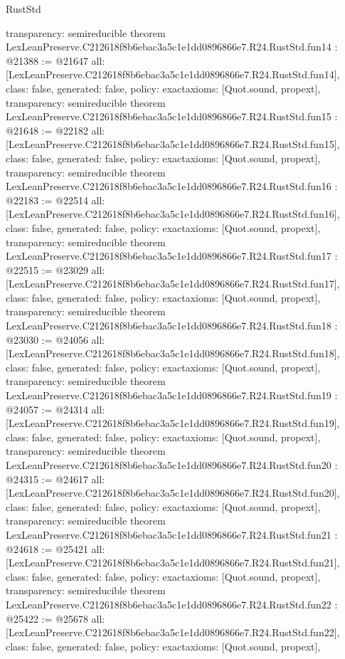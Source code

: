\begin{lexlean}{RustStd}
\begin{coremodule}
{  transparency: semireducible
}
theorem LexLeanPreserve.C212618f8b6ebac3a5c1e1dd0896866e7.R24.RustStd.fun14 : @21388 := @21647 {
  all: [LexLeanPreserve.C212618f8b6ebac3a5c1e1dd0896866e7.R24.RustStd.fun14],
  class: false,
  generated: false,
  policy: exact{axioms: [Quot.sound, propext]},
  transparency: semireducible
}
theorem LexLeanPreserve.C212618f8b6ebac3a5c1e1dd0896866e7.R24.RustStd.fun15 : @21648 := @22182 {
  all: [LexLeanPreserve.C212618f8b6ebac3a5c1e1dd0896866e7.R24.RustStd.fun15],
  class: false,
  generated: false,
  policy: exact{axioms: [Quot.sound, propext]},
  transparency: semireducible
}
theorem LexLeanPreserve.C212618f8b6ebac3a5c1e1dd0896866e7.R24.RustStd.fun16 : @22183 := @22514 {
  all: [LexLeanPreserve.C212618f8b6ebac3a5c1e1dd0896866e7.R24.RustStd.fun16],
  class: false,
  generated: false,
  policy: exact{axioms: [Quot.sound, propext]},
  transparency: semireducible
}
theorem LexLeanPreserve.C212618f8b6ebac3a5c1e1dd0896866e7.R24.RustStd.fun17 : @22515 := @23029 {
  all: [LexLeanPreserve.C212618f8b6ebac3a5c1e1dd0896866e7.R24.RustStd.fun17],
  class: false,
  generated: false,
  policy: exact{axioms: [Quot.sound, propext]},
  transparency: semireducible
}
theorem LexLeanPreserve.C212618f8b6ebac3a5c1e1dd0896866e7.R24.RustStd.fun18 : @23030 := @24056 {
  all: [LexLeanPreserve.C212618f8b6ebac3a5c1e1dd0896866e7.R24.RustStd.fun18],
  class: false,
  generated: false,
  policy: exact{axioms: [Quot.sound, propext]},
  transparency: semireducible
}
theorem LexLeanPreserve.C212618f8b6ebac3a5c1e1dd0896866e7.R24.RustStd.fun19 : @24057 := @24314 {
  all: [LexLeanPreserve.C212618f8b6ebac3a5c1e1dd0896866e7.R24.RustStd.fun19],
  class: false,
  generated: false,
  policy: exact{axioms: [Quot.sound, propext]},
  transparency: semireducible
}
theorem LexLeanPreserve.C212618f8b6ebac3a5c1e1dd0896866e7.R24.RustStd.fun20 : @24315 := @24617 {
  all: [LexLeanPreserve.C212618f8b6ebac3a5c1e1dd0896866e7.R24.RustStd.fun20],
  class: false,
  generated: false,
  policy: exact{axioms: [Quot.sound, propext]},
  transparency: semireducible
}
theorem LexLeanPreserve.C212618f8b6ebac3a5c1e1dd0896866e7.R24.RustStd.fun21 : @24618 := @25421 {
  all: [LexLeanPreserve.C212618f8b6ebac3a5c1e1dd0896866e7.R24.RustStd.fun21],
  class: false,
  generated: false,
  policy: exact{axioms: [Quot.sound, propext]},
  transparency: semireducible
}
theorem LexLeanPreserve.C212618f8b6ebac3a5c1e1dd0896866e7.R24.RustStd.fun22 : @25422 := @25678 {
  all: [LexLeanPreserve.C212618f8b6ebac3a5c1e1dd0896866e7.R24.RustStd.fun22],
  class: false,
  generated: false,
  policy: exact{axioms: [Quot.sound, propext]},
}
\end{coremodule}
\end{lexlean}
